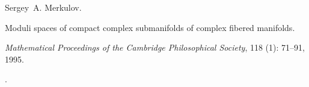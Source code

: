 Sergey~A. Merkulov.

\newblock Moduli spaces of compact complex submanifolds of complex fibered
  manifolds.

\newblock \emph{Mathematical Proceedings of the Cambridge Philosophical
  Society}, 118 (1): 71--91, 1995.

\newblock {}.


